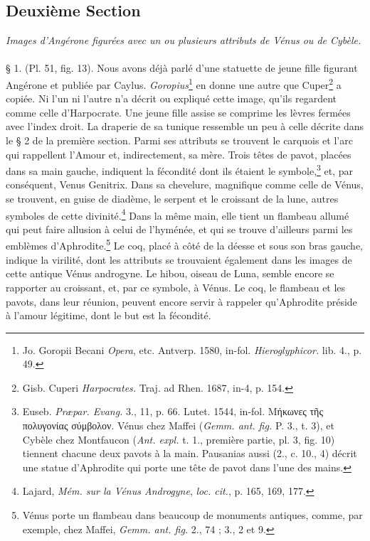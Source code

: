 \documentclass[a4paper, 11pt, oneside, polutonikogreek, french]{article}
\begin{document}
\subsection{Deuxième Section}
\begin{center}
\emph{Images d'Angérone figurées avec un ou plusieurs attributs de Vénus ou de Cybèle.}
\end{center}
\paragraph{}
§ 1. (Pl. 51, fig. 13). Nous avons déjà parlé d'une statuette de jeune fille figurant Angérone et publiée par Caylus. \emph{Goropius}\footnote{Jo. Goropii Becani \emph{Opera}, etc. Antverp. 1580, in-fol. \emph{Hieroglyphicor.} lib. 4., p. 49.} en donne une autre que Cuper\footnote{Gisb. Cuperi \emph{Harpocrates.} Traj. ad Rhen. 1687, in-4, p. 154.} a copiée. Ni l'un ni l'autre n'a décrit ou expliqué cette image, qu'ils regardent comme celle d'Harpocrate. Une jeune fille assise se comprime les lèvres fermées avec l'index droit. La draperie de sa tunique ressemble un peu à celle décrite dans le § 2 de la première section. Parmi ses attributs se trouvent le carquois et l'arc qui rappellent l'Amour et, indirectement, sa mère. Trois têtes de pavot, placées dans sa main gauche, indiquent la fécondité dont ils étaient le symbole,\footnote{Euseb. \emph{Præpar. Evang.} 3., 11, p. 66. Lutet. 1544, in-fol. Μήκωνες τῆς πολυγονίας σύμβολον. Vénus chez Maffei (\emph{Gemm. ant. fig.} P. 3., t. 3), et Cybèle chez Montfaucon (\emph{Ant. expl.} t. 1., première partie, pl. 3, fig. 10) tiennent chacune deux pavots à la main. Pausanias aussi (2., c. 10., 4) décrit une statue d'Aphrodite qui porte une tête de pavot dans l'une des mains.} et, par conséquent, Venus Genitrix. Dans sa chevelure, magnifique comme celle de Vénus, se trouvent, en guise de diadème, le serpent et le croissant de la lune, autres symboles de cette divinité.\footnote{Lajard, \emph{Mém. sur la Vénus Androgyne}, \emph{loc. cit.}, p. 165, 169, 177.} Dans la même main, elle tient un flambeau allumé qui peut faire allusion à celui de l'hyménée, et qui se trouve d'ailleurs parmi les emblèmes d'Aphrodite.\footnote{Vénus porte un flambeau dans beaucoup de monuments antiques, comme, par exemple, chez Maffei, \emph{Gemm. ant. fig.} 2., 74 ; 3., 2 et 9.} Le coq, placé à côté de la déesse et sous son bras gauche, indique la virilité, dont les attributs se trouvaient également dans les images de cette antique Vénus androgyne. Le hibou, oiseau de Luna, semble encore se rapporter au croissant, et, par ce symbole, à Vénus. Le coq, le flambeau et les pavots, dans leur réunion, peuvent encore servir à rappeler qu'Aphrodite préside à l'amour légitime, dont le but est la fécondité.
\end{document}
